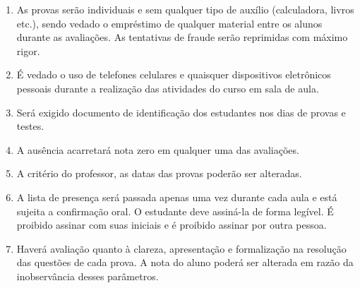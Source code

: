 \documentclass[12pt]{exam}
\begin{document}

    \begin{enumerate}[label={\arabic*})]
        \item As provas serão individuais e sem qualquer tipo de auxílio (calculadora, livros etc.), sendo vedado o empréstimo de qualquer material entre os alunos durante as avaliações. As tentativas de fraude serão reprimidas com máximo rigor.

        \item É vedado o uso de telefones celulares e quaisquer dispositivos eletrônicos pessoais durante a realização das atividades do curso em sala de aula.

        \item Será exigido documento de identificação dos estudantes nos dias de provas e testes.

        \item A ausência acarretará nota zero em qualquer uma das avaliações.

        \item A critério do professor, as datas das provas poderão ser alteradas.

        \item A lista de presença será passada apenas uma vez durante cada aula e está sujeita a confirmação oral. O estudante deve assiná-la de forma legível. É proibido assinar com suas iniciais e é proibido assinar por outra pessoa.

        \item Haverá avaliação quanto à clareza, apresentação e formalização na  resolução das questões de cada prova. A nota do aluno poderá ser alterada em razão da inobservância desses parâmetros.

    \end{enumerate}
\end{document}
